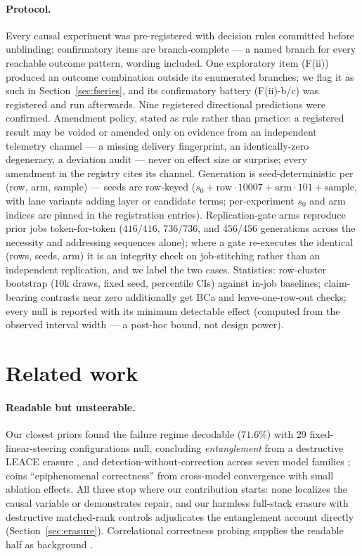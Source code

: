 \documentclass{article} %
\begin{document}
\paragraph{Protocol.} Every causal experiment was pre-registered with
decision rules committed before unblinding; confirmatory items are
branch-complete --- a named branch for every reachable outcome
pattern, wording included. One exploratory item (F(ii)) produced an
outcome combination outside its enumerated branches; we flag it as
such in Section~\ref{sec:fseries}, and its confirmatory battery
(F(ii)-b/c) was registered and run afterwards. Nine registered
directional predictions were confirmed. Amendment policy, stated as
rule rather than practice: a registered result may be voided or
amended only on evidence from an independent telemetry channel ---
a missing delivery fingerprint, an identically-zero degeneracy, a
deviation audit --- never on effect size or surprise; every amendment
in the registry cites its channel.
Generation is seed-deterministic per (row, arm, sample) --- seeds are
row-keyed ($s_0 + \mathrm{row}\cdot 10007 + \mathrm{arm}\cdot 101 +
\mathrm{sample}$, with lane variants adding layer or candidate terms;
per-experiment $s_0$ and arm indices are pinned in the registration
entries). Replication-gate arms
reproduce prior jobs token-for-token ($416/416$, $736/736$, and
$456/456$ generations across the necessity and addressing sequences
alone); where a gate re-executes the identical (rows, seeds, arm) it
is an integrity check on job-stitching rather than an independent
replication, and we label the two cases. Statistics: row-cluster
bootstrap (10k draws, fixed
seed, percentile CIs) against in-job baselines; claim-bearing
contrasts near zero additionally get BCa and leave-one-row-out
checks; every null is reported with its minimum detectable effect
(computed from the observed interval width --- a post-hoc bound, not
design power).

\section{Related work}\label{sec:related}

\paragraph{Readable but unsteerable.} Our closest priors found the
failure regime decodable ($71.6\%$) with 29 fixed-linear-steering
configurations null, concluding \emph{entanglement} from a destructive
LEACE erasure \citep{decodable2026}, and detection-without-correction
across seven model families \citep{detection2026};
\citet{epiphenomenal2026} coins ``epiphenomenal correctness'' from
cross-model convergence with small ablation effects. All three stop
where our contribution starts: none localizes the causal variable or
demonstrates repair, and our harmless full-stack erasure with
destructive matched-rank controls adjudicates the entanglement account
directly (Section~\ref{sec:erasure}). Correlational correctness probing
supplies the readable half as background
\citep{midreasoning2026, intermediate2025, coral2026}.
\end{document}
